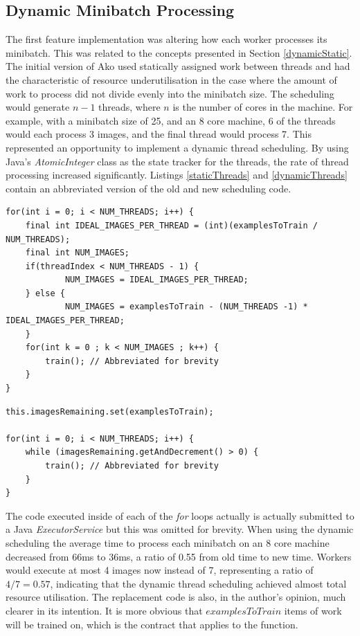 \documentclass[12pt]{article}
\begin{document}
\subsection{Dynamic Minibatch Processing}

The first feature implementation was altering how each worker processes its minibatch. This was related to the concepts presented in Section \ref{dynamicStatic}. The initial version of Ako used statically assigned work between threads and had the characteristic of resource underutilisation in the case where the amount of work to process did not divide evenly into the minibatch size. The scheduling would generate $n-1$ threads, where $n$ is the number of cores in the machine. For example, with a minibatch size of 25, and an 8 core machine, 6 of the threads would each process 3 images, and the final thread would process 7. This represented an opportunity to implement a dynamic thread scheduling. By using Java's \textit{AtomicInteger} class as the state tracker for the threads, the rate of thread processing increased significantly. Listings \ref{staticThreads} and \ref{dynamicThreads} contain an abbreviated version of the old and new scheduling code.

\begin{lstlisting}[caption={Old, static thread scheduling},label=staticThreads]
for(int i = 0; i < NUM_THREADS; i++) {
	final int IDEAL_IMAGES_PER_THREAD = (int)(examplesToTrain / NUM_THREADS);
	final int NUM_IMAGES;
	if(threadIndex < NUM_THREADS - 1) {    
    		NUM_IMAGES = IDEAL_IMAGES_PER_THREAD;
	} else {
    		NUM_IMAGES = examplesToTrain - (NUM_THREADS -1) * IDEAL_IMAGES_PER_THREAD;
	}
	for(int k = 0 ; k < NUM_IMAGES ; k++) {
		train(); // Abbreviated for brevity
	}
}
\end{lstlisting}

\begin{lstlisting}[caption={Dynamic thread scheduling replacement},label=dynamicThreads]
this.imagesRemaining.set(examplesToTrain);

for(int i = 0; i < NUM_THREADS; i++) {
    while (imagesRemaining.getAndDecrement() > 0) {
		train(); // Abbreviated for brevity
	}
}
\end{lstlisting}

The code executed inside of each of the \textit{for} loops actually is actually submitted to a Java \textit{ExecutorService} but this was omitted for brevity. When using the dynamic scheduling the average time to process each minibatch on an 8 core machine decreased from 66ms to 36ms, a ratio of 0.55 from old time to new time. Workers would execute at most 4 images now instead of 7, representing a ratio of $4/7 = 0.57$, indicating that the dynamic thread scheduling achieved almost total resource utilisation. The replacement code is also, in the author's opinion, much clearer in its intention. It is more obvious that $examplesToTrain$ items of work will be trained on, which is the contract that applies to the function.
\end{document}
